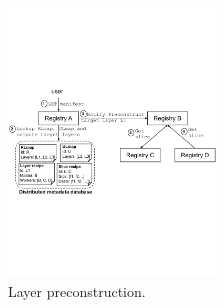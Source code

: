 \begin{figure}[t]
	\centering
	\centering
	\includegraphics[width=0.49\textwidth]{graphs/sift-preconstruct.pdf}
	\caption{Layer preconstruction.}
	\label{fig:preconstruct}
\end{figure}